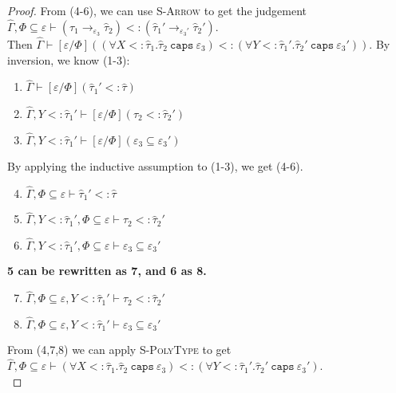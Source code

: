 \documentclass{llncs}
\newcommand{\keywadj}[1]{\mathtt{#1}}
\newcommand{\keyw}[1]{\keywadj{#1}~}
\newcommand{\kw}[1]{\keyw{ #1 }}
\begin{document}
\begin{proof}
\noindent
From (4-6), we can use \textsc{S-Arrow} to get the judgement $\hat \Gamma, \Phi \subseteq \varepsilon \vdash (\hat \tau_1 \rightarrow_{\varepsilon_3} \hat \tau_2) <: (\hat \tau_1' \rightarrow_{\varepsilon_3'} \hat \tau_2')$.\\

 Then $\hat \Gamma \vdash [\varepsilon/\Phi]((\forall X <: \hat \tau_1. \hat \tau_2~\kw{caps} \varepsilon_3) <: (\forall Y <: \hat \tau_1'. \hat \tau_2'~\kw{caps} \varepsilon_3'))$. By inversion, we know (1-3):

\begin{enumerate}
	\item $\hat \Gamma \vdash [\varepsilon/\Phi](\hat \tau_1' <: \hat \tau)$
	\item $\hat \Gamma, Y <: \hat \tau_1' \vdash [\varepsilon/\Phi](\hat \tau_2 <: \hat \tau_2')$
	\item $\hat \Gamma, Y <: \hat \tau_1' \vdash [\varepsilon/\Phi](\varepsilon_3 \subseteq \varepsilon_3')$
\end{enumerate}

\noindent
By applying the inductive assumption to (1-3), we get (4-6).

\begin{enumerate}
	\setcounter{enumi}{3}
	\item $\hat \Gamma, \Phi \subseteq \varepsilon \vdash \hat \tau_1' <: \hat \tau$
	\item $\hat \Gamma, Y <: \hat \tau_1', \Phi \subseteq \varepsilon \vdash \hat \tau_2 <: \hat \tau_2'$
	\item $\hat \Gamma, Y <: \hat \tau_1', \Phi \subseteq \varepsilon \vdash \varepsilon_3 \subseteq \varepsilon_3'$
\end{enumerate}

\noindent
\textbf{5 can be rewritten as 7, and 6 as 8.}
	
\begin{enumerate}
	\setcounter{enumi}{6}
	\item $\hat \Gamma, \Phi \subseteq \varepsilon , Y <: \hat \tau_1' \vdash \hat \tau_2 <: \hat \tau_2'$
	\item $\hat \Gamma, \Phi \subseteq \varepsilon, Y <: \hat \tau_1' \vdash \varepsilon_3 \subseteq \varepsilon_3'$
\end{enumerate}

\noindent
From (4,7,8) we can apply \textsc{S-PolyType} to get $\hat \Gamma, \Phi \subseteq \varepsilon \vdash (\forall X <: \hat \tau_1. \hat \tau_2~\kw{caps} \varepsilon_3) <: (\forall Y <: \hat \tau_1'. \hat \tau_2'~\kw{caps} \varepsilon_3')$.\\


\end{proof}
\end{document}
